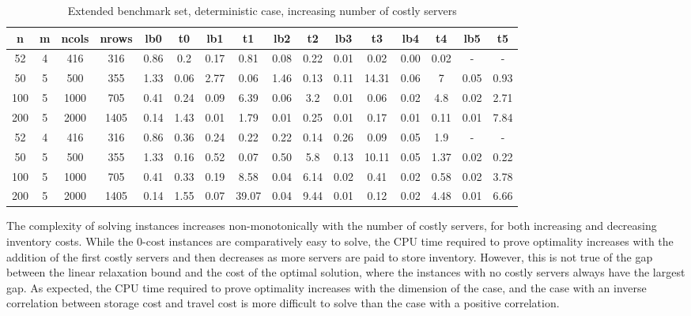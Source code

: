 \documentclass[preprint,11pt,authoryear]{elsarticle}
\begin{document}
\begin{table}
	\addtolength{\tabcolsep}{-3pt}
	\footnotesize 
	\centering
	\renewcommand{\arraystretch}{1.2}
	\begin{tabular}{cccc|cc|cc|cc|cc|cc|cc}
		n & m & ncols & nrows & lb0 & t0 & lb1 & t1 & lb2 & t2 & lb3 & t3 & lb4 & t4 & lb5 & t5 \\
		\hline
		52 & 4  & 416 & 316 & 0.86 & 0.2 & 0.17 & 0.81 & 0.08 & 0.22 & 0.01 & 0.02 & 0.00 & 0.02 & - & - \\
		50 & 5  & 500 & 355 & 1.33 & 0.06 & 2.77 & 0.06 & 1.46 & 0.13 & 0.11 & 14.31 & 0.06 & 7 & 0.05 & 0.93 \\
		100 & 5 & 1000 & 705 & 0.41 & 0.24 & 0.09 & 6.39 & 0.06 & 3.2 & 0.01 & 0.06 & 0.02 & 4.8 & 0.02 & 2.71 \\
		200 & 5 & 2000 & 1405 & 0.14 & 1.43 & 0.01 & 1.79 & 0.01 & 0.25 & 0.01 & 0.17 & 0.01 & 0.11 & 0.01 & 7.84 \\
		\hline
		52 & 4  & 416 & 316 & 0.86 & 0.36 & 0.24 & 0.22 & 0.22 & 0.14 & 0.26 & 0.09 & 0.05 & 1.9 & - & - \\
		50 & 5  & 500 & 355 & 1.33 & 0.16 & 0.52 & 0.07 & 0.50 & 5.8 & 0.13 & 10.11 & 0.05 & 1.37 & 0.02 & 0.22 \\
		100 & 5 & 1000 & 705 & 0.41 & 0.33 & 0.19 & 8.58 & 0.04 & 6.14 & 0.02 & 0.41 & 0.02 & 0.58 & 0.02 & 3.78 \\
		200 & 5 & 2000 & 1405 & 0.14 & 1.55 & 0.07 & 39.07 & 0.04 & 9.44 & 0.01 & 0.12 & 0.02 & 4.48 & 0.01 & 6.66 \\
		\hline
	\end{tabular}
	\caption{Extended benchmark set, deterministic case, increasing number of costly servers}
	\label{table:extsetq}
\end{table}

The complexity of solving instances increases non-monotonically with the number of costly servers, for both increasing and decreasing inventory costs. While the 0-cost instances are comparatively easy to solve, the CPU time required to prove optimality increases with the addition of the first costly servers and then decreases as more servers are paid to store inventory. However, this is not true of the gap between the linear relaxation bound and the cost of the optimal solution, where the instances with no costly servers always have the largest gap.
As expected, the CPU time required to prove optimality increases with the dimension of the case, and the case with an inverse correlation between storage cost and travel cost is more difficult to solve than the case with a positive correlation.
\end{document}
